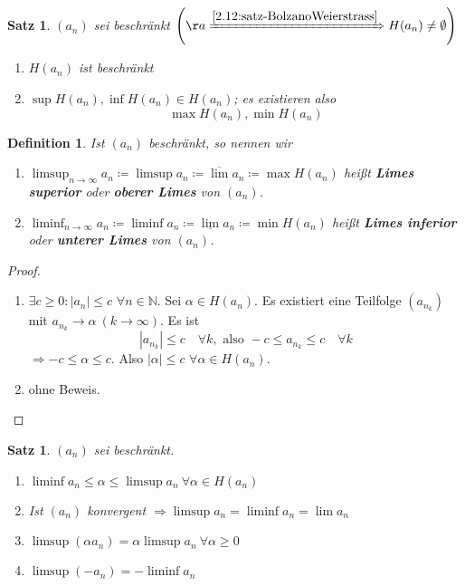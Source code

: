 \documentclass[14pt,titlepage,ngerman,a4paper,headsepline,DIV15,halfparskip*]{scrartcl}
\newcommand{\N}{\mathbb{N}}
\theoremstyle{named}
\theoremstyle{dotless}
\newtheorem{satz}[namedtheorem]{Satz}
\newtheorem*{definition}{Definition}
\begin{document}
\begin{satz} \label{2.13:satz}
	$(a_{n})$ sei beschränkt $\left( å\xRightarrow[]{\ref{2.12:satz-BolzanoWeierstrass}} H(a_{n}) \neq \emptyset \right)$
	\begin{enumerate}
		\item $H(a_{n})$ ist beschränkt
		\item $\sup H(a_{n}), \inf H(a_{n}) \in H(a_{n})$; es existieren also
			$$ \max H(a_{n}), \min H(a_{n}) $$
	\end{enumerate}
\end{satz}

   
\begin{definition} 
	Ist $(a_{n})$ beschränkt, so nennen wir 
	\begin{enumerate}
		\item $\limsup_{n \rightarrow \infty} a_{n} \coloneqq \limsup a_{n} \coloneqq \overline{\lim} a_{n} \coloneqq \max H(a_{n})$ hei{\ss}t \textbf{Limes superior} oder \textbf{oberer Limes} von $(a_{n})$.
		\item $\liminf_{n \rightarrow \infty} a_{n} \coloneqq \liminf a_{n} \coloneqq \underline{\lim} a_{n} \coloneqq \min H(a_{n})$ hei{\ss}t \textbf{Limes inferior} oder \textbf{unterer Limes} von $(a_{n})$.
	\end{enumerate}
\end{definition}


\begin{proof}\
	\begin{enumerate}
		\item $\exists c \geq 0: |a_{n}| \leq c$ $\forall n \in \N$. Sei $\alpha \in H(a_{n})$. Es existiert eine Teilfolge $(a_{n_{k}})$ mit $a_{n_{k}} \rightarrow \alpha ~(k \rightarrow \infty)$. Es ist
			$$ |a_{n_{k}}| \leq c \quad \forall k, \text{ also } -c \leq a_{n_{k}} \leq c \quad \forall k $$ 
			$\Rightarrow - c \leq \alpha \leq c$. Also $|\alpha| \leq c$ $\forall \alpha \in H(a_{n})$.
		\item ohne Beweis.
	\end{enumerate}
\end{proof}


\begin{satz} \label{2.14:satz}
	$(a_{n})$ sei beschränkt.
	\begin{enumerate}
		\item $\liminf a_{n} \leq \alpha \leq \limsup a_{n} ~\forall \alpha \in H(a_{n})$
		\item Ist $(a_{n})$ konvergent $\Rightarrow \limsup a_{n} = \liminf a_{n} = \lim a_{n}$
		\item $\limsup(\alpha a_{n}) = \alpha \limsup a_{n} ~\forall \alpha \geq 0$
		\item $\limsup(-a_{n}) = - \liminf a_{n}$
	\end{enumerate}
\end{satz}
\end{document}

